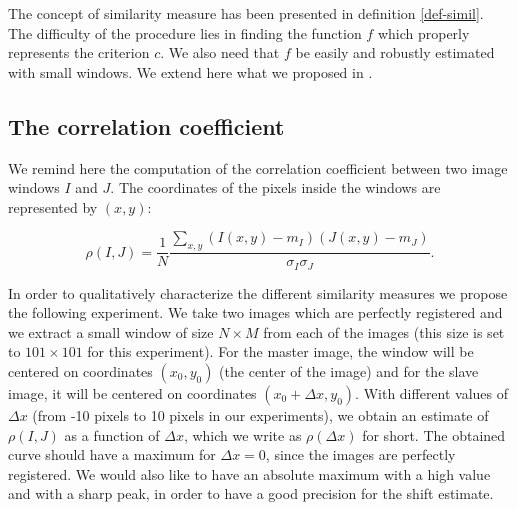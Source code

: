 The concept of similarity measure has been presented in definition
\ref{def-simil}. The difficulty of the procedure lies in finding the
function $f$ which properly represents the criterion $c$. We also need
that $f$ be easily and robustly estimated with small windows. We extend here what we proposed in \cite{ig02simil}.\\

\subsection{The correlation coefficient\label{expe}}
We remind here the computation of the correlation coefficient between
two image windows $I$ and $J$. The coordinates of the pixels inside
the windows are represented by $(x,y)$:

\begin{equation}
\rho(I,J) = \frac{1}{N}\frac{\sum_{x,y}(I(x,y)-m_I)(J(x,y)-m_J)}{\sigma_I
\sigma_J}.
\label{coeffcorr}
\end{equation}

In order to qualitatively characterize the different similarity
measures we propose the following experiment. We take two images which
are perfectly registered and we extract a small window
of size $N\times M$ from each of the images (this size is set to
$101\times 101$ for this experiment). For the master image, the
window will be centered on coordinates $(x_0,
y_0)$ (the center of the image) and for the slave image, it will be centered on coordinates $(x_0+\Delta x,
y_0)$. With different values of $\Delta x$ (from -10 pixels to 10
pixels in our experiments), we obtain an estimate of $\rho(I,J)$ as a
function of $\Delta x$, which we write as
$\rho(\Delta x)$ for short. The obtained curve should have a maximum for
$\Delta x =0$, since the images are perfectly registered. We would
also like to have an absolute maximum with a high value and with a
sharp peak, in order to have a good precision for the shift estimate.\\



